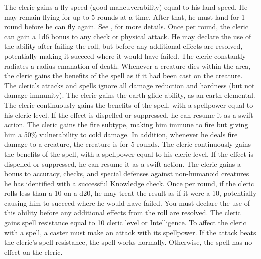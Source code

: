             The cleric gains a fly speed (good maneuverability) equal to his land speed.
            He may remain flying for up to 5 rounds at a time.
            After that, he must land for 1 round before he can fly again.
            See , for more details.
            Once per round, the cleric can gain a \plus1d6 bonus to any check or physical attack.
            He may declare the use of the ability after failing the roll, but before any additional effects are resolved, potentially making it succeed where it would have failed.
            The cleric constantly radiates a \areamed radius emanation of death.
            Whenever a creature dies within the area, the cleric gains the benefits of the  spell as if it had been cast on the creature.
            The cleric's attacks and spells ignore all damage reduction and hardness (but not damage immunity).
            The cleric gains the earth glide ability, as an earth elemental.
             The cleric continuously gains the benefits of the 
            spell, with a spellpower equal to his cleric level.
            If the effect is dispelled or suppressed, he can resume it as a swift action.
            The cleric gains the fire subtype, making him immune to fire but giving him a 50\% vulnerability to cold damage.
            In addition, whenever he deals fire damage to a creature, the creature is \ignited for 5 rounds.
             The cleric continuously gains the benefits of the 
            spell, with a spellpower equal to his cleric level.
            If the effect is dispelled or suppressed, he can resume it as a swift action.
            The cleric gains a  bonus to accuracy, checks, and special defenses against non-humanoid creatures he has identified with a successful Knowledge check.
            Once per round, if the cleric rolls less than a 10 on a d20, he may treat the result as if it were a 10, potentially causing him to succeed where he would have failed.
            You must declare the use of this ability before any additional effects from the roll are resolved.
            The cleric gains spell resistance equal to 10 \add cleric level or Intelligence.
            To affect the cleric with a spell, a caster must make an attack with its spellpower.
            If the attack beats the cleric's spell resistance, the spell works normally.
            Otherwise, the spell has no effect on the cleric.


